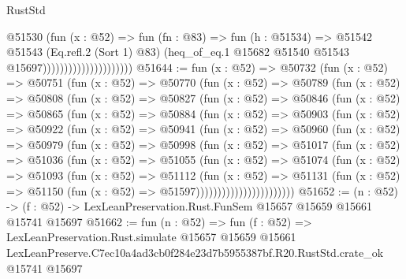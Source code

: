 \begin{lexlean}{RustStd}
\begin{coremodule}
                                        @51530
                                          (fun (x : @52) =>
                                          fun (fn : @83) =>
                                          fun (h : @51534) =>
                                          @51542
                                            @51543
                                            (Eq.refl.{2} (Sort 1) @83)
                                            (heq_of_eq.{1}
                                              @15682
                                              @51540
                                              @51543
                                              @15697)))))))))))))))))))))
@51644 := fun (x : @52) =>
  @50732
    (fun (x : @52) =>
    @50751
      (fun (x : @52) =>
      @50770
        (fun (x : @52) =>
        @50789
          (fun (x : @52) =>
          @50808
            (fun (x : @52) =>
            @50827
              (fun (x : @52) =>
              @50846
                (fun (x : @52) =>
                @50865
                  (fun (x : @52) =>
                  @50884
                    (fun (x : @52) =>
                    @50903
                      (fun (x : @52) =>
                      @50922
                        (fun (x : @52) =>
                        @50941
                          (fun (x : @52) =>
                          @50960
                            (fun (x : @52) =>
                            @50979
                              (fun (x : @52) =>
                              @50998
                                (fun (x : @52) =>
                                @51017
                                  (fun (x : @52) =>
                                  @51036
                                    (fun (x : @52) =>
                                    @51055
                                      (fun (x : @52) =>
                                      @51074
                                        (fun (x : @52) =>
                                        @51093
                                          (fun (x : @52) =>
                                          @51112
                                            (fun (x : @52) =>
                                            @51131
                                              (fun (x : @52) =>
                                              @51150 (fun (x : @52) => @51597)))))))))))))))))))))))
@51652 := (n : @52) ->
  (f : @52) -> LexLeanPreservation.Rust.FunSem @15657 @15659 @15661 @15741 @15697
@51662 := fun (n : @52) =>
  fun (f : @52) =>
  LexLeanPreservation.Rust.simulate
    @15657
    @15659
    @15661
    LexLeanPreserve.C7ec10a4ad3cb0f284e23d7b5955387bf.R20.RustStd.crate_ok
    @15741
    @15697
\end{coremodule}
\end{lexlean}
